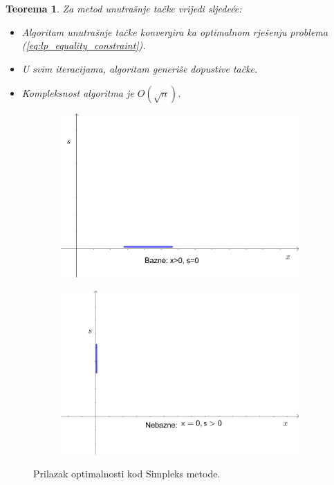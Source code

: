 \documentclass[b5paper, utf8, 11pt, colorlinks]{book}
\newtheorem{thm}{Teorema}[chapter]
\theoremstyle{definition}
\begin{document}
\begin{thm} Za metod unutrašnje tačke vrijedi sljedeće:
	\begin{itemize} \setlength\itemsep{0.1em}
		\item Algoritam unutrašnje tačke konvergira ka optimalnom rješenju problema (\ref{eq:lp_equality_constraint}). %
		\item U svim iteracijama, algoritam generiše dopustive tačke.
		\item Kompleksnost algoritma je $O(\sqrt{n})$. %
	\end{itemize}
\end{thm}

\begin{figure}
	\centering
	\begin{subfigure}{.45\textwidth}
		\centering
		\includegraphics[width=.9\linewidth]{interior-1}  
	\end{subfigure}
	\begin{subfigure}{.45\textwidth}
		\centering
		\includegraphics[width=.9\linewidth]{interior-2}  
	\end{subfigure}
	\caption{Prilazak optimalnosti kod Simpleks metode.}
	\label{fig:optimality-approaching-simplex}
\end{figure}
\end{document}
